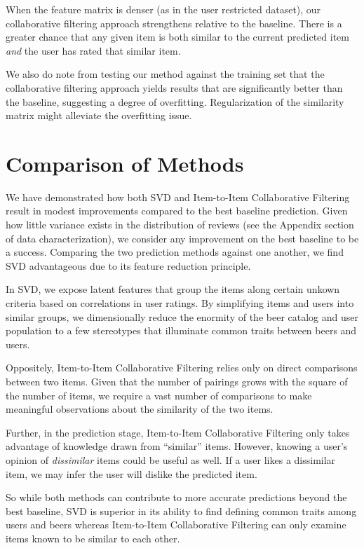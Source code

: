 \documentclass[12pt]{article}
\begin{document}
When the feature matrix is denser (as in the user restricted dataset), our collaborative filtering approach strengthens relative to the baseline. There is a greater chance that any given item is both similar to the current predicted item \textit{and} the user has rated that similar item.

We also do note from testing our method against the training set that the collaborative filtering approach yields results that are significantly better than the baseline, suggesting a degree of overfitting. Regularization of the similarity matrix might alleviate the overfitting issue.

\section{Comparison of Methods}
We have demonstrated how both SVD and Item-to-Item Collaborative Filtering result in modest improvements compared to the best baseline prediction. Given how little variance exists in the distribution of reviews (see the Appendix section of data characterization), we consider any improvement on the best baseline to be a success. Comparing the two prediction methods against one another, we find SVD advantageous due to its feature reduction principle.

In SVD, we expose latent features that group the items along certain unkown criteria based on correlations in user ratings. By simplifying items and users into similar groups, we dimensionally reduce the enormity of the beer catalog and user population to a few stereotypes that illuminate common traits between beers and users.

Oppositely, Item-to-Item Collaborative Filtering relies only on direct comparisons between two items. Given that the number of pairings grows with the square of the number of items, we require a vast number of comparisons to make meaningful observations about the similarity of the two items.

Further, in the prediction stage, Item-to-Item Collaborative Filtering only takes advantage of knowledge drawn from ``similar'' items. However, knowing a user's opinion of \textit{dissimilar} items could be useful as well. If a user likes a dissimilar item, we may infer the user will dislike the predicted item.

So while both methods can contribute to more accurate predictions beyond the best baseline, SVD is superior in its ability to find defining common traits among users and beers whereas Item-to-Item Collaborative Filtering can only examine items known to be similar to each other.
\end{document}
